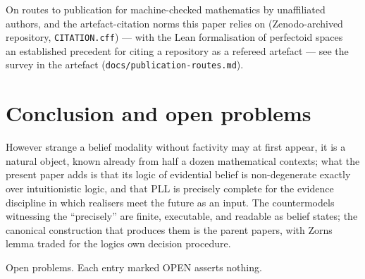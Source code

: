 On routes to publication for machine-checked mathematics by
unaffiliated authors, and the artefact-citation norms this paper relies
on (Zenodo-archived repository, \texttt{CITATION.cff}) --- with the
Lean formalisation of perfectoid
spaces~\cite{BuzzardCommelinMassot2020} an established precedent for
citing a repository as a refereed artefact --- see the survey in the
artefact (\texttt{docs/publication-routes.md}).

\section{Conclusion and open problems}\label{10-conclusion-and-open-problems}

However strange a belief modality without factivity may at first
appear, it is a natural object, known already from half a dozen
mathematical contexts; what the present paper adds is that its logic of
evidential belief is non-degenerate exactly over intuitionistic logic,
and that PLL is precisely complete for the evidence discipline in which
realisers meet the future as an input. The countermodels witnessing the
``precisely'' are finite, executable, and readable as belief states; the
canonical construction that produces them is the parent paper\textquotesingle s, with
Zorn\textquotesingle s lemma traded for the logic\textquotesingle s own decision procedure.

Open problems. Each entry marked OPEN asserts nothing.

